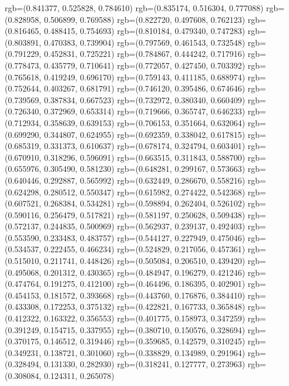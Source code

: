{{{					rgb=(0.841377, 0.525828, 0.784610)
					rgb=(0.835174, 0.516304, 0.777088)
					rgb=(0.828958, 0.506899, 0.769588)
					rgb=(0.822720, 0.497608, 0.762123)
					rgb=(0.816465, 0.488415, 0.754693)
					rgb=(0.810184, 0.479340, 0.747283)
					rgb=(0.803891, 0.470383, 0.739904)
					rgb=(0.797569, 0.461543, 0.732548)
					rgb=(0.791229, 0.452831, 0.725221)
					rgb=(0.784867, 0.444242, 0.717916)
					rgb=(0.778473, 0.435779, 0.710641)
					rgb=(0.772057, 0.427450, 0.703392)
					rgb=(0.765618, 0.419249, 0.696170)
					rgb=(0.759143, 0.411185, 0.688974)
					rgb=(0.752644, 0.403267, 0.681791)
					rgb=(0.746120, 0.395486, 0.674646)
					rgb=(0.739569, 0.387834, 0.667523)
					rgb=(0.732972, 0.380340, 0.660409)
					rgb=(0.726340, 0.372969, 0.653314)
					rgb=(0.719666, 0.365747, 0.646233)
					rgb=(0.712934, 0.358639, 0.639153)
					rgb=(0.706153, 0.351664, 0.632064)
					rgb=(0.699290, 0.344807, 0.624955)
					rgb=(0.692359, 0.338042, 0.617815)
					rgb=(0.685319, 0.331373, 0.610637)
					rgb=(0.678174, 0.324794, 0.603401)
					rgb=(0.670910, 0.318296, 0.596091)
					rgb=(0.663515, 0.311843, 0.588700)
					rgb=(0.655976, 0.305490, 0.581230)
					rgb=(0.648281, 0.299167, 0.573663)
					rgb=(0.640446, 0.292887, 0.565992)
					rgb=(0.632449, 0.286670, 0.558216)
					rgb=(0.624298, 0.280512, 0.550347)
					rgb=(0.615982, 0.274422, 0.542368)
					rgb=(0.607521, 0.268384, 0.534281)
					rgb=(0.598894, 0.262404, 0.526102)
					rgb=(0.590116, 0.256479, 0.517821)
					rgb=(0.581197, 0.250628, 0.509438)
					rgb=(0.572137, 0.244835, 0.500969)
					rgb=(0.562937, 0.239137, 0.492403)
					rgb=(0.553590, 0.233483, 0.483757)
					rgb=(0.544127, 0.227949, 0.475046)
					rgb=(0.534537, 0.222455, 0.466234)
					rgb=(0.524829, 0.217056, 0.457361)
					rgb=(0.515010, 0.211741, 0.448426)
					rgb=(0.505084, 0.206510, 0.439420)
					rgb=(0.495068, 0.201312, 0.430365)
					rgb=(0.484947, 0.196279, 0.421246)
					rgb=(0.474764, 0.191275, 0.412100)
					rgb=(0.464496, 0.186395, 0.402901)
					rgb=(0.454153, 0.181572, 0.393668)
					rgb=(0.443760, 0.176876, 0.384410)
					rgb=(0.433308, 0.172253, 0.375132)
					rgb=(0.422821, 0.167733, 0.365848)
					rgb=(0.412322, 0.163322, 0.356553)
					rgb=(0.401775, 0.158973, 0.347259)
					rgb=(0.391249, 0.154715, 0.337955)
					rgb=(0.380710, 0.150576, 0.328694)
					rgb=(0.370175, 0.146512, 0.319446)
					rgb=(0.359685, 0.142579, 0.310245)
					rgb=(0.349231, 0.138721, 0.301060)
					rgb=(0.338829, 0.134989, 0.291964)
					rgb=(0.328494, 0.131330, 0.282930)
					rgb=(0.318241, 0.127777, 0.273963)
					rgb=(0.308084, 0.124311, 0.265078)
}}}

